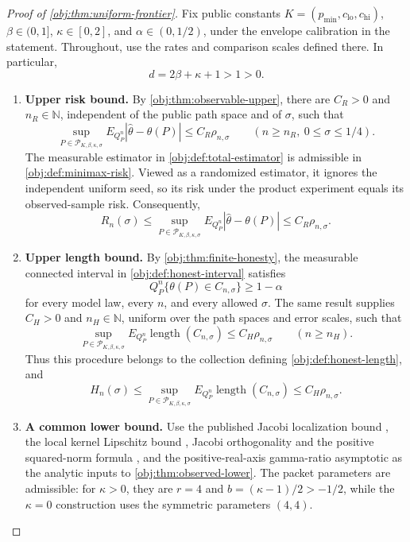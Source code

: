 \documentclass[11pt]{article}
\begin{document}
\begin{proof}[Proof of \cref{obj:thm:uniform-frontier}]
Fix public constants \(K=(p_{\min},c_{\mathrm{lo}},c_{\mathrm{hi}})\), \(\beta\in(0,1]\), \(\kappa\in[0,2]\), and \(\alpha\in(0,1/2)\), under the envelope calibration in the statement. Throughout, use the rates and comparison scales defined there. In particular,
\[
d=2\beta+\kappa+1>1>0.
\]

\begin{enumerate}
\item \textbf{Upper risk bound.}
By \cref{obj:thm:observable-upper}, there are \(C_R>0\) and \(n_R\in\mathbb N\), independent of the public path space and of \(\sigma\), such that
\[
\sup_{P\in\mathcal P_{K,\beta,\kappa,\sigma}}
E_{Q_P^n}|\widehat\theta-\theta(P)|
\le C_R\rho_{n,\sigma}
\qquad
(n\ge n_R,\ 0\le\sigma\le1/4).
\]
The measurable estimator in \cref{obj:def:total-estimator} is admissible in \cref{obj:def:minimax-risk}. Viewed as a randomized estimator, it ignores the independent uniform seed, so its risk under the product experiment equals its observed-sample risk. Consequently,
\[
R_n(\sigma)
\le
\sup_{P\in\mathcal P_{K,\beta,\kappa,\sigma}}
E_{Q_P^n}|\widehat\theta-\theta(P)|
\le C_R\rho_{n,\sigma}.
\]

\item \textbf{Upper length bound.}
By \cref{obj:thm:finite-honesty}, the measurable connected interval in \cref{obj:def:honest-interval} satisfies
\[
Q_P^n\{\theta(P)\in C_{n,\sigma}\}\ge1-\alpha
\]
for every model law, every \(n\), and every allowed \(\sigma\). The same result supplies \(C_H>0\) and \(n_H\in\mathbb N\), uniform over the path spaces and error scales, such that
\[
\sup_{P\in\mathcal P_{K,\beta,\kappa,\sigma}}
E_{Q_P^n}\operatorname{length}(C_{n,\sigma})
\le C_H\rho_{n,\sigma}
\qquad(n\ge n_H).
\]
Thus this procedure belongs to the collection defining \cref{obj:def:honest-length}, and
\[
H_n(\sigma)
\le
\sup_{P\in\mathcal P_{K,\beta,\kappa,\sigma}}
E_{Q_P^n}\operatorname{length}(C_{n,\sigma})
\le C_H\rho_{n,\sigma}.
\]

\item \textbf{A common lower bound.}
Use the published Jacobi localization bound
\citep[Theorem 2.4, equation (2.14)]{PetrushevXu2005},
the local kernel Lipschitz bound
\citep[Theorem 2.2, equation (2.4)]{https://people.math.sc.edu/pencho/Publications/kpx-06-28-06-web.pdf},
Jacobi orthogonality and the positive squared-norm formula
\citep[Table 18.3.1, Jacobi row and caption]{https://dlmf.nist.gov/18.3},
and the positive-real-axis gamma-ratio asymptotic
\citep[equation (5.11.12)]{https://dlmf.nist.gov/5.11.E12}
as the analytic inputs to \cref{obj:thm:observed-lower}.
The packet parameters are admissible: for \(\kappa>0\), they are
\(r=4\) and \(b=(\kappa-1)/2>-1/2\), while the \(\kappa=0\) construction uses the symmetric parameters \((4,4)\).


\end{enumerate}
\end{proof}
\end{document}
